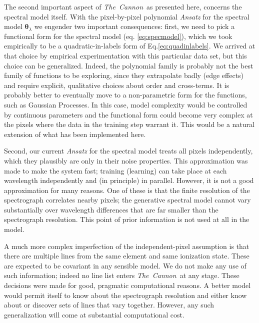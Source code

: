 \documentclass[12pt, preprint]{aastex}
\newcommand{\tc}{\textsl{The~Cannon}}
\newcommand{\set}[1]{\bm{#1}}
\begin{document}
The second important aspect of \tc\ as presented here, concerns the spectral model itself. With the pixel-by-pixel polynomial \textit{Ansatz} for the spectral model $\set{\theta}_\lambda$
we engender two important consequences: first, we need to pick a functional form for the spectral model
(eq. \ref{eq:specmodel}), which we took empirically to be a quadratic-in-labels form of Eq.\ref{eq:quadinlabels}. We arrived at that choice by empirical experimentation with this particular data set, but this choice can be generalized.
Indeed, the polynomial family is probably not the best family of
functions to be exploring, since they extrapolate badly (edge effects)
and require explicit, qualitative choices about order and cross-terms.
It is probably better to eventually move to a non-parametric form for the functions,
such as Gaussian Processes.
In this case, model complexity would be controlled by continuous
parameters and the functional form could become very complex at the pixels where the data in the
training step warrant it.
This would be a natural extension of what has been implemented here.

Second, our current \textit{Ansatz} for the spectral model treats all
pixels independently, which they plausibly are only in their noise properties.
This approximation was made to make the system fast; training
(learning) can take place at each wavelength independently and (in
principle) in parallel.
However, it is not a good approximation for many reasons.
One of these is that the finite resolution of the spectrograph
correlates nearby pixels; the generative spectral model cannot vary
substantially over wavelength differences that are far smaller than
the spectrograph resolution.
This point of prior information is not used at all in the model.

A much more complex imperfection of the independent-pixel assumption is 
 that there are multiple lines from the same element and same ionization state.
These are expected to be covariant in any sensible model.
We do not make any use of such information; indeed no line list enters
\tc\ at any stage.
These decisions were made for good, pragmatic computational reasons.
A better model would permit itself to know about the spectrograph
resolution and either know about or discover sets of lines that vary
together.
However, any such generalization will come at substantial computational cost.
\end{document}

